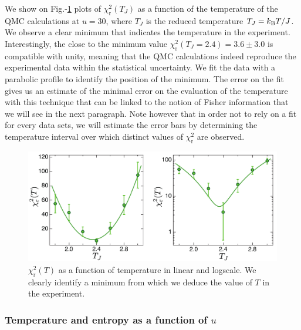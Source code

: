 We show on Fig.-\ref{fig:chi_vs_T} plots of $\chi_{\mathrm{r}}^{2}(T_J)$ as a function of the temperature of the QMC calculations at $u=30$, where $T_J$ is the reduced temperature $T_J = k_{\mathrm{B}} T /J$. We observe a clear minimum that indicates the temperature in the experiment. Interestingly, the close to the minimum value $\chi_{\mathrm{r}}^{2}\left(T_{J}=2.4\right)=3.6 \pm 3.0$ is compatible with unity, meaning that the QMC calculations indeed reproduce the experimental data within the statistical uncertainty. We fit the data with a parabolic profile to identify the position of the minimum. The error on the fit gives us an estimate of the minimal error on the evaluation of the temperature with this technique that can be linked to the notion of Fisher information that we will see in the next paragraph. Note however that in order not to rely on a fit for every data sets, we will estimate the error bars by determining the temperature interval over which distinct values of $\chi_{\mathrm{r}}^{2}$ are observed.

\begin{figure}
    \centering
    \includegraphics[width=1\textwidth]{Fig/Chapter3/chi_square.pdf}
    \caption[$\chi_{\mathrm{r}}^{2}(T)$ as a function of temperature in linear and logscale]{$\chi_{\mathrm{r}}^{2}(T)$ as a function of temperature in linear and logscale. We clearly identify a minimum from which we deduce the value of $T$ in the experiment.}
    \label{fig:chi_vs_T}
\end{figure}

\subsubsection{Temperature and entropy as a function of $u$}

